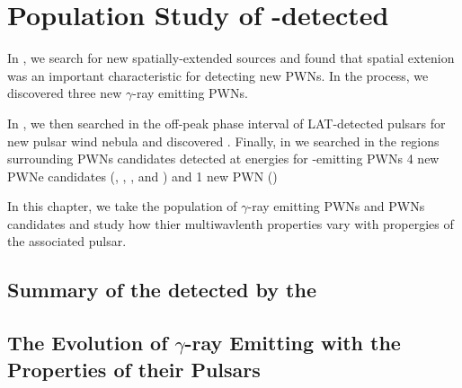 \chapter{Population Study of -detected }


In , we search for new spatially-extended \fermi
sources and found that spatial extenion was an important characteristic
for detecting new \acp{PWN}. In the process, we discovered three
new $\gamma$-ray emitting \acp{PWN}.  

In , we then
searched in the off-peak phase interval of \ac{LAT}-detected pulsars
for new pulsar wind nebula and discovered \threecfiftyeight.  Finally,
in  we searched in the regions surrounding \acp{PWN}
candidates detected at \tev energies for \gev-emitting \acp{PWN}
4 new PWNe candidates (, , ,
and ) and 1 new PWN ()

In this chapter, we take the population of $\gamma$-ray emitting \acp{PWN}
and \acp{PWN} candidates and study how thier multiwavlenth properties
vary with propergies of the associated pulsar.


\section{Summary of the  detected by the }

\section{The Evolution of $\gamma$-ray Emitting  with the Properties of their Pulsars}




